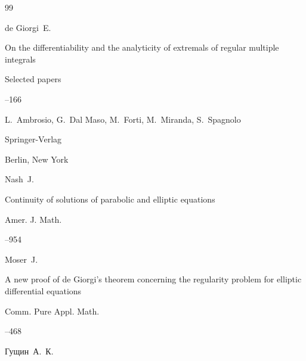 \begin{thebibliography}{99}
\transl

\by de Giorgi~E.

\paper On the differentiability and the analyticity of extremals of regular multiple integrals

\inbook Selected papers


--166

\eds L.~Ambrosio, G.~Dal Maso, M.~Forti, M.~Miranda, S.~Spagnolo

\publ Springer-Verlag

\publaddr Berlin, New York






\by Nash~J.

\paper Continuity of solutions of parabolic and elliptic equations

\jour Amer. J. Math.




--954







\by Moser~J.

\paper A new proof of de Giorgi's theorem concerning the regularity problem for elliptic differential equations

\jour Comm. Pure Appl. Math.




--468







\by Гущин~А.~К.


\end{thebibliography}
